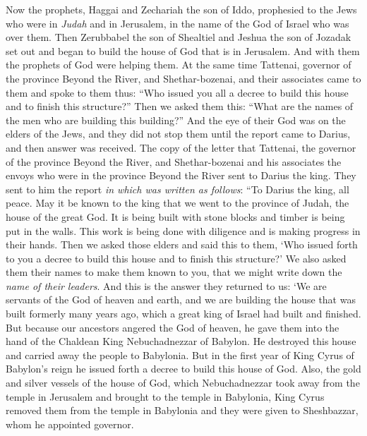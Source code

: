 \begin{biblechapter} %
 Now the prophets, Haggai and Zechariah the son of Iddo, prophesied to the Jews who were in \textit{Judah} and in Jerusalem, in the name of the God of Israel who was over them.
\verse Then Zerubbabel the son of Shealtiel and Jeshua the son of Jozadak set out and began to build the house of God that is in Jerusalem. And with them the prophets of God were helping them.
\verse At the same time Tattenai, governor of the province Beyond the River, and Shethar-bozenai, and their associates came to them and spoke to them thus: “Who issued you all a decree to build this house and to finish this structure?”
\verse Then we asked them this: “What are the names of the men who are building this building?”
\verse And the eye of their God was on the elders of the Jews, and they did not stop them until the report came to Darius, and then answer was received.
\verse The copy of the letter that Tattenai, the governor of the province Beyond the River, and Shethar-bozenai and his associates the envoys who were in the province Beyond the River sent to Darius the king.
\verse They sent to him the report \textit{in which was written as follows}: “To Darius the king, all peace.
\verse May it be known to the king that we went to the province of Judah, the house of the great God. It is being built with stone blocks and timber is being put in the walls. This work is being done with diligence and is making progress in their hands.
\verse Then we asked those elders and said this to them, ‘Who issued forth to you a decree to build this house and to finish this structure?’
\verse We also asked them their names to make them known to you, that we might write down the \textit{name of their leaders}.
\verse And this is the answer they returned to us: ‘We are servants of the God of heaven and earth, and we are building the house that was built formerly many years ago, which a great king of Israel had built and finished.
\verse But because our ancestors angered the God of heaven, he gave them into the hand of the Chaldean King Nebuchadnezzar of Babylon. He destroyed this house and carried away the people to Babylonia.
\verse But in the first year of King Cyrus of Babylon’s reign he issued forth a decree to build this house of God.
\verse Also, the gold and silver vessels of the house of God, which Nebuchadnezzar took away from the temple in Jerusalem and brought to the temple in Babylonia, King Cyrus removed them from the temple in Babylonia and they were given to Sheshbazzar, whom he appointed governor.

\end{biblechapter}
